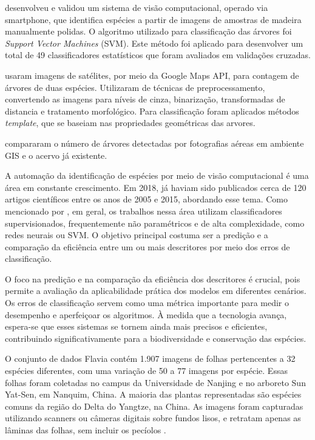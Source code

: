 \documentclass[
    12pt,                   %
    openright,              %
    oneside,                %
    a4paper,                %
    sumario=tradicional,    %
    english,                %
    brazil,                 %
    ]{abntex2}
\begin{document}
    \textcite{andrade2020visao} desenvolveu e validou um sistema de visão computacional, operado via smartphone, que identifica espécies a partir de imagens de amostras de madeira manualmente polidas.    O algoritmo utilizado para classificação das árvores foi \textit{Support Vector Machines} (SVM). Este método foi aplicado para desenvolver um total de 49 classificadores estatísticos que foram avaliados em validações cruzadas.

    \textcite{da2019metodologias} usaram imagens de satélites, por meio da Google Maps API, para contagem de árvores de duas espécies. Utilizaram de técnicas de preprocessamento, convertendo as imagens para níveis de cinza, binarização, transformadas de distancia e tratamento morfológico. Para classificação foram aplicados métodos \textit{template}, que se baseiam nas propriedades geométricas das arvores.

    \textcite{neto2012detecccao} compararam o número de árvores detectadas por fotografias aéreas em ambiente GIS e o acervo já existente. 

    A automação da identificação de espécies por meio de visão computacional é uma área em constante crescimento. Em 2018, já haviam sido publicados cerca de 120 artigos científicos entre os anos de 2005 e 2015, abordando esse tema\cite{waldchen2018plant}. Como mencionado por \textcite{andrade2020visao}, em geral, os trabalhos nessa área utilizam classificadores supervisionados, frequentemente não paramétricos e de alta complexidade, como redes neurais ou SVM. O objetivo principal costuma ser a predição e a comparação da eficiência entre um ou mais descritores por meio dos erros de classificação.

    O foco na predição e na comparação da eficiência dos descritores é crucial, pois permite a avaliação da aplicabilidade prática dos modelos em diferentes cenários. Os erros de classificação servem como uma métrica importante para medir o desempenho e aperfeiçoar os algoritmos. À medida que a tecnologia avança, espera-se que esses sistemas se tornem ainda mais precisos e eficientes, contribuindo significativamente para a biodiversidade e conservação das espécies.

    O conjunto de dados Flavia contém 1.907 imagens de folhas pertencentes a 32 espécies diferentes, com uma variação de 50 a 77 imagens por espécie. Essas folhas foram coletadas no campus da Universidade de Nanjing e no arboreto Sun Yat-Sen, em Nanquim, China. A maioria das plantas representadas são espécies comuns da região do Delta do Yangtze, na China. As imagens foram capturadas utilizando scanners ou câmeras digitais sobre fundos lisos, e retratam apenas as lâminas das folhas, sem incluir os pecíolos \cite{waldchen2018plant}.
\end{document}
